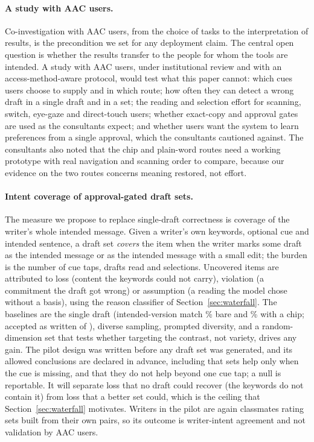 \paragraph{A study with AAC users.}
Co-investigation with AAC users, from the choice of tasks to the interpretation of results, is the precondition we set for any deployment claim.
The central open question is whether the results transfer to the people for whom the tools are intended.
A study with AAC users, under institutional review and with an access-method-aware protocol, would test what this paper cannot: which cues users choose to supply and in which route; how often they can detect a wrong draft in a single draft and in a set; the reading and selection effort for scanning, switch, eye-gaze and direct-touch users; whether exact-copy and approval gates are used as the consultants expect; and whether users want the system to learn preferences from a single approval, which the consultants cautioned against.
The consultants also noted that the chip and plain-word routes need a working prototype with real navigation and scanning order to compare, because our evidence on the two routes concerns meaning restored, not effort.

\paragraph{Intent coverage of approval-gated draft sets.}
The measure we propose to replace single-draft correctness is coverage of the writer's whole intended message.
Given a writer's own keywords, optional cue and intended sentence, a draft set \emph{covers} the item when the writer marks some draft as the intended message or as the intended message with a small edit; the burden is the number of cue taps, drafts read and selections.
Uncovered items are attributed to loss (content the keywords could not carry), violation (a commitment the draft got wrong) or assumption (a reading the model chose without a basis), using the reason classifier of Section~\ref{sec:waterfall}.
The baselines are the single draft (intended-version match \jmpOneEightMatchBare{}\% bare and \jmpOneEightMatchChip{}\% with a chip; accepted as written \jmpOneEightAcceptYesK{} of \jmpOneEightAcceptN{}), diverse sampling, prompted diversity, and a random-dimension set that tests whether targeting the contrast, not variety, drives any gain.
The pilot design was written before any draft set was generated, and its allowed conclusions are declared in advance, including that sets help only when the cue is missing, and that they do not help beyond one cue tap; a null is reportable.
It will separate loss that no draft could recover (the keywords do not contain it) from loss that a better set could, which is the ceiling that Section~\ref{sec:waterfall} motivates.
Writers in the pilot are again classmates rating sets built from their own pairs, so its outcome is writer-intent agreement and not validation by AAC users.

